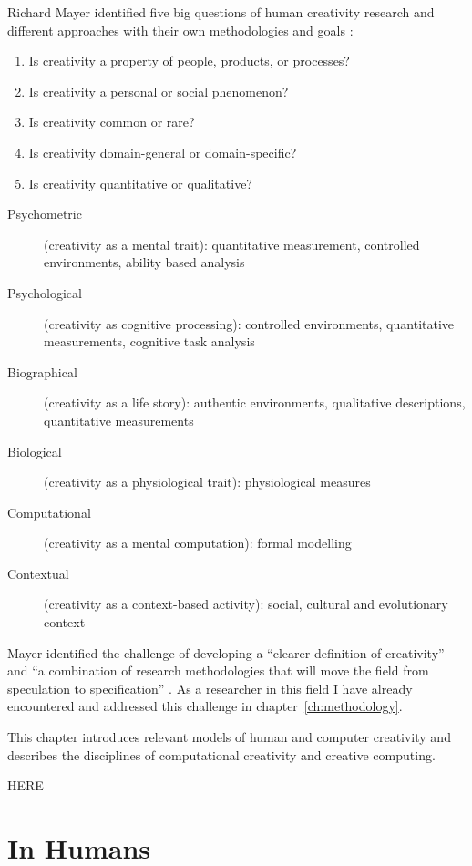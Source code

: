 Richard Mayer identified five big questions of human creativity research and different approaches with their own methodologies and goals \autocite[p.450-451,453]{Mayer1999}:

\label{s:Mayer5questions}
\begin{enumerate}
  \item Is creativity a property of people, products, or processes?
  \item Is creativity a personal or social phenomenon?
  \item Is creativity common or rare?
  \item Is creativity domain-general or domain-specific?
  \item Is creativity quantitative or qualitative?
\end{enumerate}

\begin{description}
  \item [Psychometric] (creativity as a mental trait): quantitative measurement, controlled environments, ability based analysis
  \item [Psychological] (creativity as cognitive processing): controlled environments, quantitative measurements, cognitive task analysis
  \item [Biographical] (creativity as a life story): authentic environments, qualitative descriptions, quantitative measurements
  \item [Biological] (creativity as a physiological trait): physiological measures
  \item [Computational] (creativity as a mental computation): formal modelling
  \item [Contextual] (creativity as a context-based activity): social, cultural and evolutionary context
\end{description}

Mayer identified the challenge of developing a ``clearer definition of creativity'' and ``a combination of research methodologies that will move the field from speculation to specification'' \autocite[p.459]{Mayer1999}. As a researcher in this field I have already encountered and addressed this challenge in chapter~\ref{ch:methodology}.

This chapter introduces relevant models of human and computer creativity and describes the disciplines of computational creativity and creative computing.

HERE

\section{In Humans}

